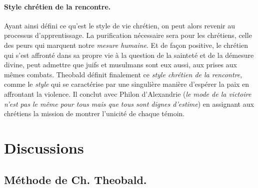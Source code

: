 \begin{comment}
    Engendrement.
Il s’agit du devenir « fils de votre Père ». Il a lieu quand on « réalise tout d’un coup
que l’appel démesuré à être connu comme Dieu, dans telle ou telle situation, est
toujours ‘à la mesure’ de chacun » (L’Unique et ses témoins, 200). Intercommuni-
cation : une autre manière de dire le dialogue avec cette nuance où l’on communique
à l’autre sa sainteté
\end{comment}
\paragraph{Style chrétien de la rencontre.} Ayant ainsi défini ce qu'est le style de vie chrétien, on peut alors revenir au processus d'apprentissage. La purification nécessaire sera pour les chrétiens, celle des peurs qui marquent notre \textit{mesure humaine}. Et de façon positive, le chrétien qui s'est affronté dans sa propre vie à la question de la sainteté et de la démesure divine, peut admettre que juifs et musulmans sont eux aussi, aux prises aux mêmes combats. Theobald définit finalement ce \textit{style chrétien de la rencontre}, comme le \textit{style} qui se caractérise par une singulière manière d'espérer la paix en affrontant la violence. Il conclut avec Philon d'Alexandrie (\textit{le mode de la victoire n'est pas le même pour tous mais que tous sont dignes d'estime}) en assignant aux chrétiens la mission de montrer l'unicité de chaque témoin. 








 
\section{Discussions}


\begin{comment}
    Reaction personnelle en discutant et critiquant de manière argumentée
\end{comment}


\subsection{Méthode de Ch. Theobald.}

